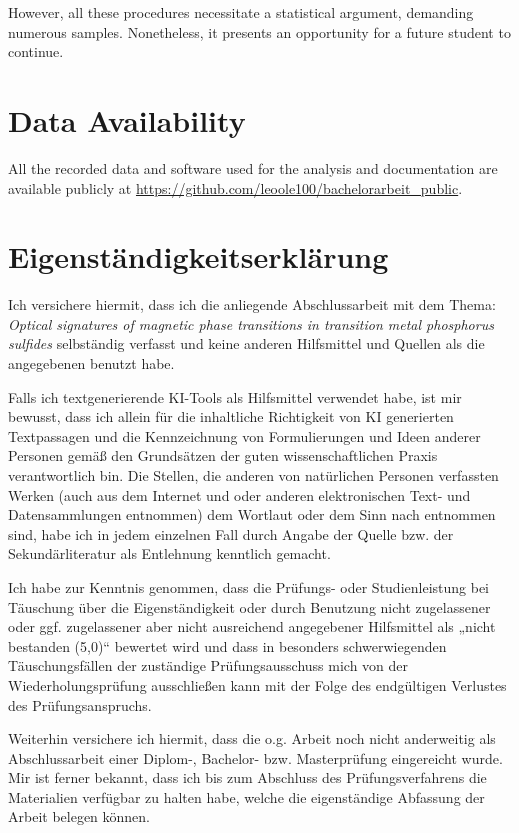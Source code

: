 \documentclass[
	twoside,
	parskip=half,
	a4paper,
]{scrbook}
\begin{document}
However, all these procedures necessitate a statistical argument, demanding numerous samples. 
Nonetheless, it presents an opportunity for a future student to continue.



\backmatter
\nocite{*}
\printbibliography

\section*{Data Availability}
All the recorded data and software used for the analysis and documentation are available publicly at \url{https://github.com/leoole100/bachelorarbeit_public}.


\clearpage
\thispagestyle{empty}
\section*{Eigenständigkeitserklärung}
Ich versichere hiermit, dass ich die anliegende Abschlussarbeit mit dem Thema:
\textit{Optical signatures of magnetic phase transitions in transition metal phosphorus sulfides}
selbständig verfasst und keine anderen Hilfsmittel und Quellen als die angegebenen benutzt habe.

Falls ich textgenerierende KI-Tools als Hilfsmittel verwendet habe, ist mir bewusst, dass ich allein für
die inhaltliche Richtigkeit von KI generierten Textpassagen und die Kennzeichnung von
Formulierungen und Ideen anderer Personen gemäß den Grundsätzen der guten wissenschaftlichen
Praxis verantwortlich bin. Die Stellen, die anderen von natürlichen Personen verfassten Werken (auch
aus dem Internet und oder anderen elektronischen Text- und Datensammlungen entnommen) dem
Wortlaut oder dem Sinn nach entnommen sind, habe ich in jedem einzelnen Fall durch Angabe der
Quelle bzw. der Sekundärliteratur als Entlehnung kenntlich gemacht.

Ich habe zur Kenntnis genommen, dass die Prüfungs- oder Studienleistung bei Täuschung über die
Eigenständigkeit oder durch Benutzung nicht zugelassener oder ggf. zugelassener aber nicht
ausreichend angegebener Hilfsmittel als „nicht bestanden (5,0)“ bewertet wird und dass in besonders
schwerwiegenden Täuschungsfällen der zuständige Prüfungsausschuss mich von der
Wiederholungsprüfung ausschließen kann mit der Folge des endgültigen Verlustes des
Prüfungsanspruchs.

Weiterhin versichere ich hiermit, dass die o.g. Arbeit noch nicht anderweitig als Abschlussarbeit einer
Diplom-, Bachelor- bzw. Masterprüfung eingereicht wurde. Mir ist ferner bekannt, dass ich bis zum
Abschluss des Prüfungsverfahrens die Materialien verfügbar zu halten habe, welche die
eigenständige Abfassung der Arbeit belegen können.
\end{document}
